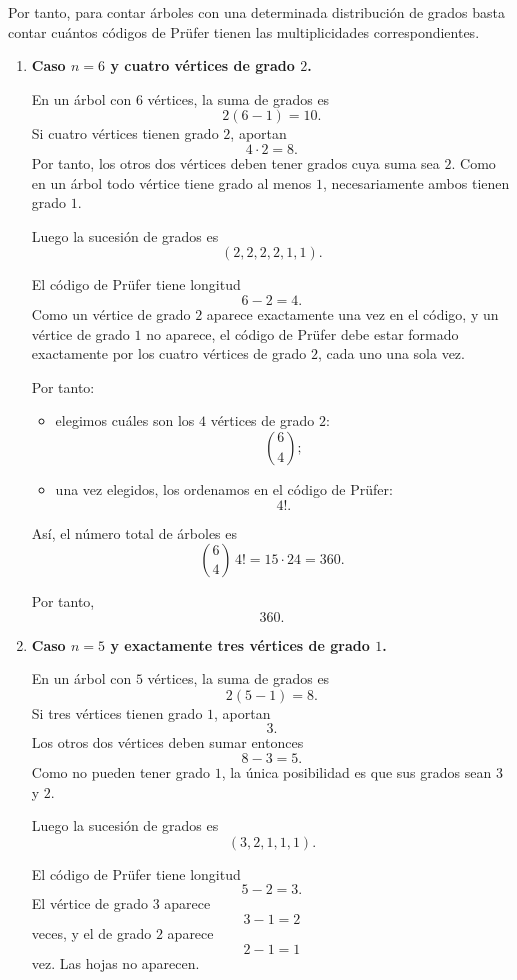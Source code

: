 \documentclass[12pt]{article}
\begin{document}
Por tanto, para contar árboles con una determinada distribución de grados basta contar cuántos códigos de Prüfer tienen las multiplicidades correspondientes.

\begin{enumerate}
    \item \textbf{Caso \(n=6\) y cuatro vértices de grado \(2\).}

    En un árbol con \(6\) vértices, la suma de grados es
    \[
    2(6-1)=10.
    \]
    Si cuatro vértices tienen grado \(2\), aportan
    \[
    4\cdot 2=8.
    \]
    Por tanto, los otros dos vértices deben tener grados cuya suma sea \(2\). Como en un árbol todo vértice tiene grado al menos \(1\), necesariamente ambos tienen grado \(1\).

    Luego la sucesión de grados es
    \[
    (2,2,2,2,1,1).
    \]

    El código de Prüfer tiene longitud
    \[
    6-2=4.
    \]
    Como un vértice de grado \(2\) aparece exactamente una vez en el código, y un vértice de grado \(1\) no aparece, el código de Prüfer debe estar formado exactamente por los cuatro vértices de grado \(2\), cada uno una sola vez.

    Por tanto:
    \begin{itemize}
        \item elegimos cuáles son los \(4\) vértices de grado \(2\):
        \[
        \binom{6}{4};
        \]
        \item una vez elegidos, los ordenamos en el código de Prüfer:
        \[
        4!.
        \]
    \end{itemize}

    Así, el número total de árboles es
    \[
    \binom{6}{4}\,4!=15\cdot 24=360.
    \]

    Por tanto,
    \[
    \boxed{360}.
    \]

    \item \textbf{Caso \(n=5\) y exactamente tres vértices de grado \(1\).}

    En un árbol con \(5\) vértices, la suma de grados es
    \[
    2(5-1)=8.
    \]
    Si tres vértices tienen grado \(1\), aportan
    \[
    3.
    \]
    Los otros dos vértices deben sumar entonces
    \[
    8-3=5.
    \]
    Como no pueden tener grado \(1\), la única posibilidad es que sus grados sean \(3\) y \(2\).

    Luego la sucesión de grados es
    \[
    (3,2,1,1,1).
    \]

    El código de Prüfer tiene longitud
    \[
    5-2=3.
    \]
    El vértice de grado \(3\) aparece
    \[
    3-1=2
    \]
    veces, y el de grado \(2\) aparece
    \[
    2-1=1
    \]
    vez. Las hojas no aparecen.


\end{enumerate}
\end{document}
